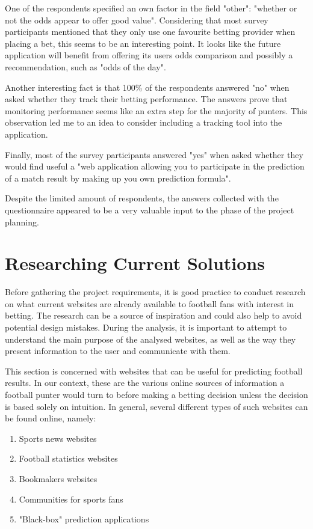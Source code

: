One of the respondents specified an own factor in the field "other": "whether or not the odds appear to offer good value". Considering that most survey participants mentioned that they only use one favourite betting provider when placing a bet, this seems to be an interesting point. It looks like the future application will benefit from offering its users odds comparison and possibly a recommendation, such as "odds of the day".

Another interesting fact is that 100\% of the respondents answered "no" when asked whether they track their betting performance. The answers prove that monitoring performance seems like an extra step for the majority of punters. This observation led me to an idea to consider including a tracking tool into the application. 

Finally, most of the survey participants answered "yes" when asked whether they would find useful a "web application allowing you to participate in the prediction of a match result by making up you own prediction formula".  

Despite the limited amount of respondents, the answers collected with the questionnaire appeared to be a very valuable input to the phase of the project planning.

\section{Researching Current Solutions}
\label{sec:currentsolutions_req}
Before gathering the project requirements, it is good practice to conduct research on what current websites are already available to football fans with interest in betting. The research can be a source of inspiration and could also help to avoid potential design mistakes. During the analysis, it is important to attempt to understand the main purpose of the analysed websites, as well as the way they present information to the user and communicate with them. 

This section is concerned with websites that can be useful for predicting football results. In our context, these are the various online sources of information a football punter would turn to before making a betting decision unless the decision is based solely on intuition. In general, several different types of such websites can be found online, namely:
		
\begin{enumerate}
	\item Sports news websites
	\item Football statistics websites
	\item Bookmakers websites 
	\item Communities for sports fans
	\item "Black-box" prediction applications
\end{enumerate}

